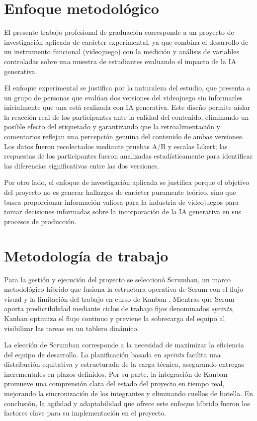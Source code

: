 \section{Enfoque metodológico}

El presente trabajo profesional de graduación corresponde a un proyecto de investigación aplicada de carácter experimental, ya que combina el desarrollo de un instrumento funcional (videojuego) con la medición y análisis de variables controladas sobre una muestra de estudiantes evaluando el impacto de la IA generativa.

El enfoque experimental se justifica por la naturaleza del estudio, que presenta a un grupo de personas que evalúan dos versiones del videojuego sin informarles inicialmente que una está realizada con IA generativa. Este diseño permite aislar la reacción real de los participantes ante la calidad del contenido, eliminando un posible efecto del etiquetado y garantizando que la retroalimentación y comentarios reflejan una percepción genuina del contenido de ambas versiones. Los datos fueron recolectados mediante pruebas A/B y escalas Likert; las respuestas de los participantes fueron analizadas estadísticamente para identificar las diferencias significativas entre las dos versiones.

Por otro lado, el enfoque de investigación aplicada se justifica porque el objetivo del proyecto no es generar hallazgos de carácter puramente teórico, sino que busca proporcionar información valiosa para la industria de videojuegos para tomar decisiones informadas sobre la incorporación de la IA generativa en sus procesos de producción.

\section{Metodología de trabajo}

Para la gestión y ejecución del proyecto se seleccionó Scrumban, un marco metodológico híbrido que fusiona la estructura operativa de Scrum con el flujo visual y la limitación del trabajo en curso de Kanban \cite{atlassian_scrumban}. Mientras que Scrum aporta predictibilidad mediante ciclos de trabajo fijos denominados \textit{sprints}, Kanban optimiza el flujo continuo y previene la sobrecarga del equipo al visibilizar las tareas en un tablero dinámico.

La elección de Scrumban corresponde a la necesidad de maximizar la eficiencia del equipo de desarrollo. La planificación basada en \textit{sprints} facilita una distribución equitativa y estructurada de la carga técnica, asegurando entregas incrementales en plazos definidos. Por su parte, la integración de Kanban promueve una comprensión clara del estado del proyecto en tiempo real, mejorando la sincronización de los integrantes y eliminando cuellos de botella. En conclusión, la agilidad y adaptabilidad que ofrece este enfoque híbrido fueron los factores clave para su implementación en el proyecto.

